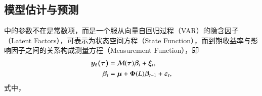 \subsection{模型估计与预测}
\dns 中的参数不在是常数项，而是一个服从向量自回归过程（VAR）的隐含因子（Latent Factors），可表示为状态空间方程（State Function），而到期收益率与影响因子之间的关系构成测量方程（Measurement Function），即
\begin{align}
\bm{y_t(\tau)} &= \mathcal{\bm{M}}(\bm{\tau}) \bm{\beta}_t  + \bm{\xi}_t, \\
\bm{\beta}_t &= \bm{\mu} + \bm{\Phi}(L)\bm{\beta}_{t-1} + \bm{\varepsilon}_t,
\end{align}
式中，
